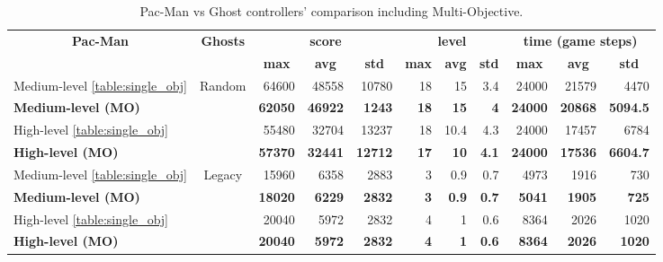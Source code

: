 \documentclass{llncs}
\newcommand{\paco}{Pac-Man }
\begin{document}
\begin{table}[tb]
\centering
\caption{\paco vs Ghost controllers' comparison including Multi-Objective.}
\label{table:multi-objective}
\begin{tabular}{|l|c|r|r|r|r|r|r|r|r|r|}
\hline
\multicolumn{1}{|c|}{\multirow{2}{*}{\textbf{\paco}}} & \multirow{2}{*}{\textbf{Ghosts}} & \multicolumn{3}{c|}{\textbf{score}} & \multicolumn{3}{c|}{\textbf{level}} & \multicolumn{3}{c|}{\textbf{time (game steps)}} \\ \cline{3-11} 
\multicolumn{1}{|c|}{} &  & \multicolumn{1}{c|}{\textbf{max}} & \multicolumn{1}{c|}{\textbf{avg}} & \multicolumn{1}{c|}{\textbf{std}} & \multicolumn{1}{c|}{\textbf{max}} & \multicolumn{1}{c|}{\textbf{avg}} & \multicolumn{1}{c|}{\textbf{std}} & \multicolumn{1}{c|}{\textbf{max}} & \multicolumn{1}{c|}{\textbf{avg}} & \multicolumn{1}{c|}{\textbf{std}} \\ \hline
Medium-level \ref{table:single_obj} & \multirow{4}{*}{Random} & {64600} & {48558} & {10780} & {18} & {15} & {3.4} & {24000} & {21579} & {4470} \\ \cline{1-1} \cline{3-11} 
\textbf{Medium-level (MO)} &  & \textbf{62050} & \textbf{46922} & \textbf{1243} & \textbf{18} & \textbf{15} & \textbf{4} & \textbf{24000} & \textbf{20868} & \textbf{5094.5} \\ \cline{1-1} \cline{3-11} 
{High-level \ref{table:single_obj}} &  & {55480} & {32704} & {13237} & {18} & {10.4} & {4.3} & {24000} & {17457} & {6784} \\ \cline{1-1} \cline{3-11} 
\textbf{High-level (MO)} &  & \textbf{57370} & \textbf{32441} & \textbf{12712} & \textbf{17} & \textbf{10} & \textbf{4.1} & \textbf{24000} & \textbf{17536} & \textbf{6604.7} \\ \hline
{Medium-level \ref{table:single_obj}} & \multirow{4}{*}{Legacy} & {15960} & {6358} & {2883} & {3} & {0.9} & {0.7} & {4973} & {1916} & {730} \\ \cline{1-1} \cline{3-11} 
\textbf{Medium-level (MO)} &  & \textbf{18020} & \textbf{6229} & \textbf{2832} & \textbf{3} & \textbf{0.9} & \textbf{0.7} & \textbf{5041} & \textbf{1905} & \textbf{725} \\ \cline{1-1} \cline{3-11} 
{High-level \ref{table:single_obj}} &  & {20040} & {5972} & {2832} & {4} & {1} & {0.6} & {8364} & {2026} & {1020} \\ \cline{1-1} \cline{3-11} 
\textbf{High-level (MO)} &  & \textbf{20040} & \textbf{5972} & \textbf{2832} & \textbf{4} & \textbf{1} & \textbf{0.6} & \textbf{8364} & \textbf{2026} & \textbf{1020} \\ \hline
\end{tabular}
\end{table}
\end{document}
